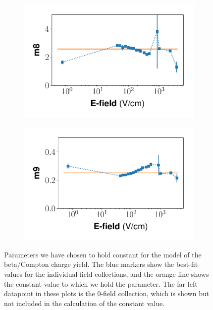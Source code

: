 \begin{figure}[!h]
\begin{subfigure}{0.33\linewidth}
  \caption{}
\end{subfigure}%
\begin{subfigure}{0.33\linewidth}
  \includegraphics[width=\textwidth]{Figures/Yields_fit_new/NEST_m8_fit_new.pdf}
  \caption{}
\end{subfigure}
\centering
\begin{subfigure}{0.33\linewidth}
  \includegraphics[width=\textwidth]{Figures/Yields_fit_new/NEST_m9_fit_new.pdf}
  \caption{}
\end{subfigure}
\caption{Parameters we have chosen to hold constant for the model of the beta/Compton charge yield. The blue markers show the best-fit values for the individual field collections, and the orange line shows the constant value to which we hold the parameter. The far left datapoint in these plots is the 0-field collection, which is shown but not included in the calculation of the constant value.}
\label{fig:betamod_constparms}
\end{figure}

